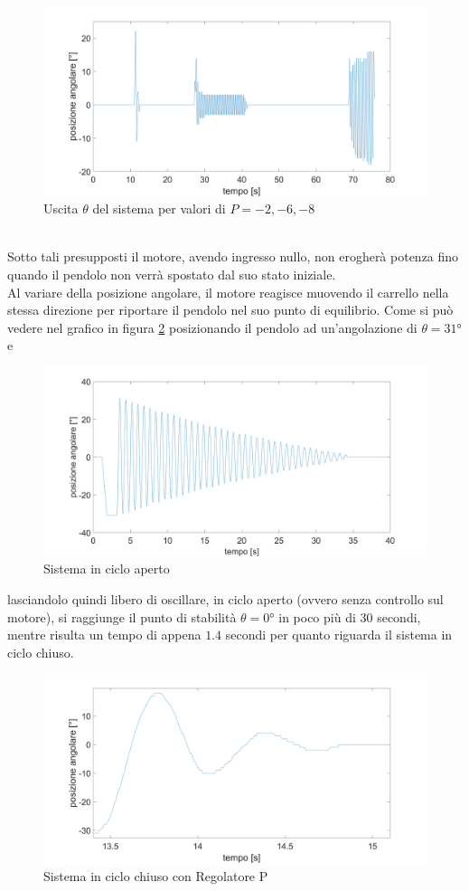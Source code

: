 \begin{figure}[ht]
	\centering
	\includegraphics[width=\textwidth]{variazioneGainP.png}
	\caption{Uscita $\theta$ del sistema per valori di $P=-2,-6,-8$}
	\label{variazioneGainP}
\end{figure}
\\Sotto tali presupposti il motore, avendo ingresso nullo, non erogherà potenza fino quando il pendolo non verrà spostato dal suo stato iniziale.\\
Al variare della posizione angolare, il motore reagisce muovendo il carrello nella stessa direzione per riportare il pendolo nel suo punto di equilibrio.
\newpage
Come si può vedere nel grafico in figura \ref{oscillOL} posizionando il pendolo ad un'angolazione di $\theta=\ang{31}$ e
\begin{figure}[ht]
	\centering
	\includegraphics[width=\textwidth]{oscillOL.PNG}
	\caption{Sistema in ciclo aperto}
	\label{oscillOL}
\end{figure}  lasciandolo quindi libero di oscillare, in ciclo aperto (ovvero senza controllo sul motore), si raggiunge il punto di stabilità $\theta=\ang{0}$ in poco più di $30$ secondi, mentre risulta un tempo di appena $1.4$ secondi per quanto riguarda il sistema in ciclo chiuso.
\begin{figure}[ht]
	\centering
	\includegraphics[width=\textwidth]{oscillCL.PNG}
	\caption{Sistema in ciclo chiuso con Regolatore P}
	\label{oscillCL}
\end{figure}
